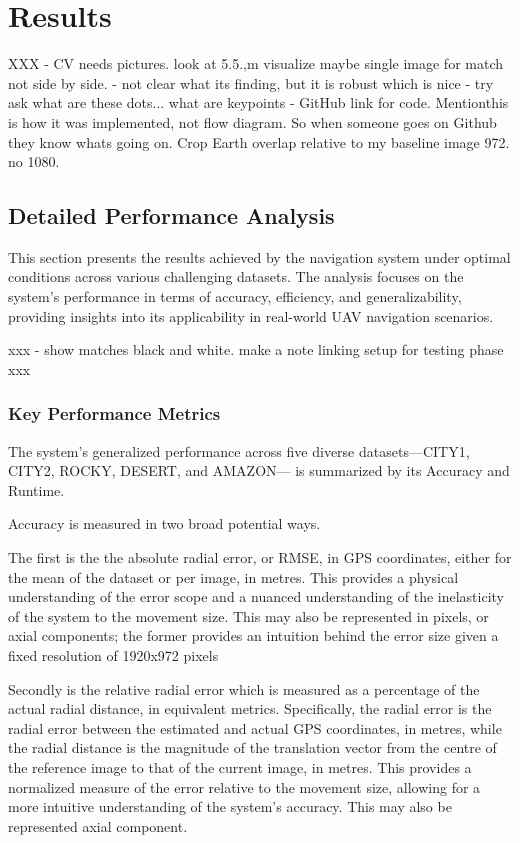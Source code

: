 
\chapter{Results}


XXX - CV needs pictures. 
look at 5.5.,m visualize maybe
single image for match not side by side. - not clear what its finding, but it is robust which is nice - try ask what are these dots... what are keypoints 
- GitHub link for code. Mentionthis is how it was implemented, not flow diagram. So when someone goes on Github they know whats going on.
Crop Earth 
overlap relative to my baseline image 972. no 1080.  

\section{Detailed Performance Analysis}

This section presents the results achieved by the navigation system under optimal conditions across various challenging datasets. The analysis focuses on the system's performance in terms of accuracy, efficiency, and generalizability, providing insights into its applicability in real-world UAV navigation scenarios.

xxx - show matches black and white. 
make a note linking setup for testing phase xxx
\subsection{Key Performance Metrics}


The system's generalized performance across five diverse datasets—CITY1, CITY2, ROCKY, DESERT, and AMAZON— is summarized by its Accuracy and Runtime. 

Accuracy is measured in two broad potential ways. 

The first is the the absolute radial error, or RMSE, in GPS coordinates, either for the mean of the dataset or per image, in metres. This provides a physical understanding of the error scope and a nuanced understanding of the inelasticity of the system to the movement size. This may also be represented in pixels, or axial components; the former provides an intuition behind the error size given a fixed resolution of 1920x972 pixels

Secondly is the relative radial error which is measured as a percentage of the actual radial distance, in equivalent metrics. Specifically, the radial error is the radial error between the estimated and actual GPS coordinates, in metres, while the radial distance is the magnitude of the translation vector from the centre of the reference image to that of the current image, in metres. This provides a normalized measure of the error relative to the movement size, allowing for a more intuitive understanding of the system's accuracy. This may also be represented axial component.



